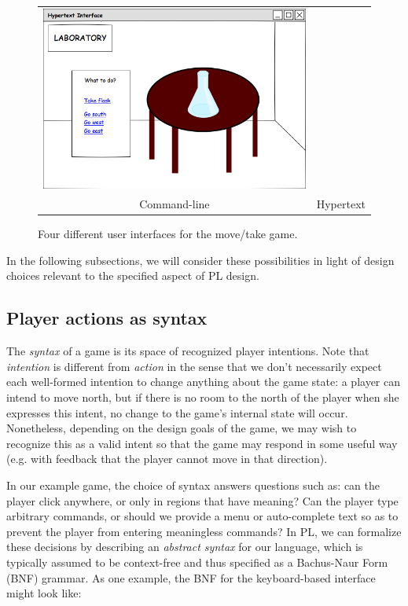 \begin{figure}
\begin{tabular}{cc}
    \includegraphics[height=0.2\textheight]{../uis/hypertext.png}\\
    Command-line & Hypertext
  \end{tabular}
  \caption{Four different user interfaces for the move/take game.}
  \label{fig:uis}
  \end{figure}

  In the
  following subsections, we will consider these possibilities in light of
  design choices relevant to the specified aspect of PL design.

  \subsection{Player actions as syntax}


  The {\em syntax} of a game is its space of recognized player intentions.
  Note that {\em intention} is different from {\em action} in the sense
  that we don't necessarily expect each well-formed intention to change
  anything about the game state: a player can intend to move north, but if
  there is no room to the north of the player when she expresses this
  intent, no change to the game's internal state will occur. Nonetheless,
  depending on the design goals of the game, we may wish to recognize this
  as a valid intent so that the game may respond in some useful way (e.g.
  with feedback that the player cannot move in that direction).
  
  In our example game, the choice of syntax answers questions such as: can
  the player click anywhere, or only in regions that have meaning? Can the
  player type arbitrary commands, or should we provide a menu or
  auto-complete text so as to prevent the player from entering meaningless
  commands?
  In PL, we can formalize these decisions by describing an {\em abstract
  syntax} for our language, which is typically assumed to be context-free
  and thus specified as a Bachus-Naur Form (BNF) grammar. As one example,
  the BNF for the keyboard-based interface might look like:

